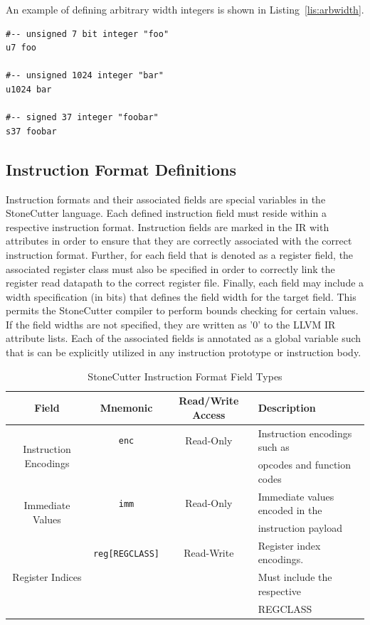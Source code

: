 \documentclass{article}
\begin{document}
An example of defining arbitrary width integers is shown in Listing~\ref{lis:arbwidth}.  

\vspace{0.125in}
\begin{lstlisting}[frame=single,style=base,caption={Arbitrary Width Datatypes},captionpos=b,label={lis:arbwidth}]
#-- unsigned 7 bit integer "foo"
u7 foo

#-- unsigned 1024 integer "bar"
u1024 bar

#-- signed 37 integer "foobar"
s37 foobar
\end{lstlisting}

\clearpage
\subsection{Instruction Format Definitions}
\label{sec:InstFormatDef}

Instruction formats and their associated fields are special variables in the StoneCutter language.  Each defined 
instruction field must reside within a respective instruction format.  Instruction fields are marked in the IR with 
attributes in order to ensure that they are correctly associated with the correct instruction format.  Further, for each 
field that is denoted as a register field, the associated register class must also be specified in order to correctly 
link the register read datapath to the correct register file.  Finally, each field may include a width specification 
(in bits) that defines the field width for the target field.  This permits the StoneCutter compiler to perform bounds checking 
for certain values.  If the field widths are not specified, they are written as '0' to the LLVM IR attribute lists.  Each of the associated fields is annotated as a global 
variable such that is can be explicitly utilized in any instruction prototype or instruction body.  

\begin{table}[h]
\begin{center}
\caption{StoneCutter Instruction Format Field Types}
\vspace{0.125in}
\label{tab:instformatfields}
\begin{tabular}{|c|c|c|l|}
\hline
\textbf{Field} & \textbf{Mnemonic} & \textbf{Read/Write Access} & \textbf{Description}\\
\hline
\multirow{2}{*}{Instruction Encodings} & \texttt{enc} & Read-Only & Instruction encodings such as\\
												  & & & opcodes and function codes\\
\hline
\multirow{2}{*}{Immediate Values} & \texttt{imm} & Read-Only & Immediate values encoded in the\\
											      & & & instruction payload\\
\hline
\multirow{3}{*}{Register Indices} & \texttt{reg[REGCLASS]} & Read-Write & Register index encodings.\\
														& & & Must include the respective\\
														& & & REGCLASS\\
\hline
\end{tabular}
\end{center}
\end{table}
\end{document}
